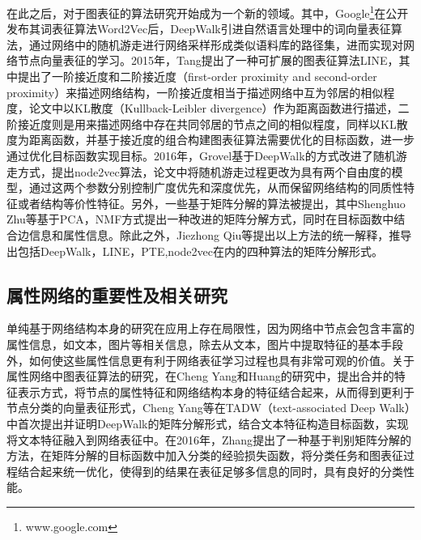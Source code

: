 在此之后，对于图表征的算法研究开始成为一个新的领域。其中，Google\footnote{www.google.com}在公开发布其词表征算法Word2Vec\cite{mikolov2013efficient}后，DeepWalk\cite{perozzi2014deepwalk}引进自然语言处理中的词向量表征算法，通过网络中的随机游走进行网络采样形成类似语料库的路径集，进而实现对网络节点向量表征的学习。2015年，Tang\cite{tang2015line}提出了一种可扩展的图表征算法LINE，其中提出了一阶接近度和二阶接近度（first-order proximity and second-order proximity）来描述网络结构，一阶接近度相当于描述网络中互为邻居的相似程度，论文中以KL散度（Kullback-Leibler divergence）作为距离函数进行描述，二阶接近度则是用来描述网络中存在共同邻居的节点之间的相似程度，同样以KL散度为距离函数，并基于接近度的组合构建图表征算法需要优化的目标函数，进一步通过优化目标函数实现目标。2016年，Grovel\cite{grover2016node2vec}基于DeepWalk的方式改进了随机游走方式，提出node2vec算法，论文中将随机游走过程更改为具有两个自由度的模型，通过这两个参数分别控制广度优先和深度优先，从而保留网络结构的同质性特征或者结构等价性特征。另外，一些基于矩阵分解的算法\cite{ahmed2013distributed,singh2008relational}被提出，其中Shenghuo Zhu等基于PCA，NMF方式提出一种改进的矩阵分解方式，同时在目标函数中结合边信息和属性信息。除此之外，Jiezhong Qiu等\cite{qiu2017network}提出以上方法的统一解释，推导出包括DeepWalk，LINE，PTE\cite{tang2015pte},node2vec在内的四种算法的矩阵分解形式。

\subsection{属性网络的重要性及相关研究}

单纯基于网络结构本身的研究在应用上存在局限性，因为网络中节点会包含丰富的属性信息，如文本，图片等相关信息，除去从文本，图片中提取特征的基本手段外，如何使这些属性信息更有利于网络表征学习过程也具有非常可观的价值。关于属性网络中图表征算法的研究，在Cheng Yang\cite{yang2015network}和Huang\cite{huang2017accelerated}的研究中，提出合并的特征表示方式，将节点的属性特征和网络结构本身的特征结合起来，从而得到更利于节点分类的向量表征形式，Cheng Yang等在TADW（text-associated Deep Walk）中首次提出并证明DeepWalk的矩阵分解形式，结合文本特征构造目标函数，实现将文本特征融入到网络表征中。在2016年，Zhang\cite{zhang2016collective}提出了一种基于判别矩阵分解的方法，在矩阵分解的目标函数中加入分类的经验损失函数，将分类任务和图表征过程结合起来统一优化，使得到的结果在表征足够多信息的同时，具有良好的分类性能。


